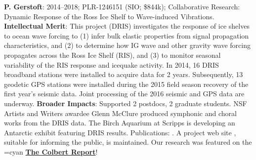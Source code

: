 {\bf  P. Gerstoft}: 2014--2018; PLR-1246151 (SIO; \$844k); Collaborative Research: Dynamic Response of the Ross Ice Shelf to Wave-induced Vibrations. {\bf Intellectual Merit}: This project (DRIS) investigates the response of ice shelves to ocean wave forcing to (1) infer bulk elastic properties from signal propagation characteristics, and (2) to determine how IG wave and other gravity wave forcing propagates across the Ross Ice Shelf (RIS), and (3) to monitor seasonal variability of the RIS response and icequake activity. In 2014, 16 DRIS broadband stations were installed to acquire data for 2 years. Subsequently, 13 geodetic GPS stations were installed during the 2015 field season recovery of the first year’s seismic data. Joint processing of the 2016 seismic and GPS data are underway. {\bf Broader Impacts}: Supported 2 postdocs, 2 graduate students. NSF Artists and Writers awardee Glenn McClure produced symphonic and choral works from the DRIS data. The Birch Aquarium at Scripps is developing an Antarctic exhibit featuring DRIS results. Publications: \cite{bromirski2015,diez2016,bromirski2017,chen2018,shen2018,chaput2018,white2019}. 
A project web site , suitable for informing the public, is maintained. 
Our research was featured on the {\urlcolor=cyan}
\href{https://www.youtube.com/watch?v=djesneud0Yg&fbclid=IwAR1zgpupmvZv2lFUy2ce2bLAgpIvi0M7OBW7P0koa0VwpwfMg5-8Pyg9hwE&app=desktop}{\bf The Colbert Report}!


